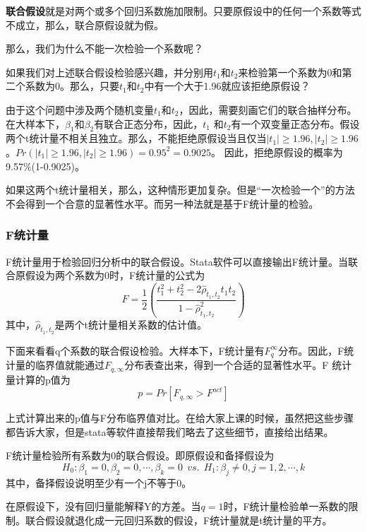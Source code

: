 \documentclass[cn,12pt,math=newtx,citestyle=gb7714-2015,bibstyle=gb7714-2015]{elegantbook}
\begin{document}
	\textbf{联合假设}就是对两个或多个回归系数施加限制。只要原假设中的任何一个系数等式不成立，那么，联合原假设就为假。
	
	那么，我们为什么不能一次检验一个系数呢？
	
	如果我们对上述联合假设检验感兴趣，并分别用$t_1$和$t_2$来检验第一个系数为0和第二个系数为0。那么，只要$t_1$和$t_2$中有一个大于1.96就应该拒绝原假设？
	
	由于这个问题中涉及两个随机变量$t_1$和$t_2$，因此，需要刻画它们的联合抽样分布。在大样本下，$\beta_1$和$\beta_2$有联合正态分布，因此，$t_1$ 和$t_2$有一个双变量正态分布。假设两个t统计量不相关且独立。那么，不能拒绝原假设当且仅当$|t_1|\geq1.96,|t_2|\geq1.96$。$Pr(|t_1|\geq1.96,|t_2|\geq1.96)=0.95^2=0.9025$。 因此，拒绝原假设的概率为9.57\%(1-0.9025)。
	
	如果这两个t统计量相关，那么，这种情形更加复杂。但是“一次检验一个”的方法不会得到一个合意的显著性水平。而另一种法就是基于F统计量的检验。
	
	\subsubsection{F统计量}
	F统计量用于检验回归分析中的联合假设。Stata软件可以直接输出F统计量。当联合原假设为两个系数为0时，F统计量的公式为
	\begin{equation}
		F=\frac{1}{2}(\frac{t_1^2+t_2^2-2\hat{\rho}_{t_1,t_2}t_1t_2}{1-\hat{\rho}_{t_1,t_2}^2})
	\end{equation}
	其中，$\hat{\rho}_{t_1,t_2}$是两个t统计量相关系数的估计值。
	
	下面来看看q个系数的联合假设检验。大样本下，F统计量有$F_q^\infty$分布。因此，F统计量的临界值就能通过$F_{q,\infty}$分布表查出来，得到一个合适的显著性水平。F 统计量计算的p值为
	\begin{equation}
		p=Pr[F_{q,\infty}>F^{act}]
	\end{equation}
	
	上式计算出来的p值与F分布临界值对比。在给大家上课的时候，虽然把这些步骤都告诉大家，但是stata等软件直接帮我们略去了这些细节，直接给出结果。
	
	F统计量检验所有系数为0的联合假设。即原假设和备择假设为
	\begin{equation}
		H_0:\beta_1=0,\beta_2=0,\cdots,\beta_k=0~~vs.~~H_1:\beta_j\neq0,j=1,2,\cdots,k
	\end{equation}
	其中，备择假设说明至少有一个j不等于0。
	
	在原假设下，没有回归量能解释Y的方差。当$q=1$时，F统计量检验单一系数的限制。联合假设就退化成一元回归系数的假设，F统计量就是t统计量的平方。
	
\end{document}
